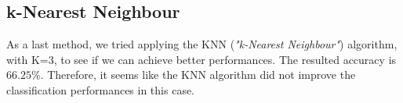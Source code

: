 \subsection{k-Nearest Neighbour}

As a last method, we tried applying the KNN (\textit{"k-Nearest Neighbour"}) algorithm, with K=3, to see if we can achieve better performances. The resulted accuracy is $66.25\%$. Therefore, it seems like the KNN algorithm did not improve the classification performances in this case.